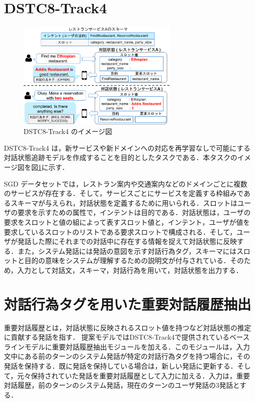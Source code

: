 \documentclass[a4j,twoside]{jarticle}
\begin{document}
\begin{論文概要}
\section{DSTC8-Track4}
\begin{figure}[htb]
  \centering
  \includegraphics[width=7.9cm]{task.eps}
  \caption{DSTC8-Track4 のイメージ図}
  \label{fig:task}
\end{figure}
DSTC8-Track4 は，新サービスや新ドメインへの対応を再学習なしで可能にする対話状態追跡モデルを作成することを目的としたタスクである．本タスクのイメージ図を図\ref{fig:task}に示す．
\par
SGD データセットでは，レストラン案内や交通案内などのドメインごとに複数のサービスが存在する．そして，サービスごとにサービスを定義する枠組みであるスキーマが与えられ，対話状態を定義するために用いられる．スロットはユーザの要求を示すための属性で，インテントは目的である．対話状態は，ユーザの要求をスロットと値の組によって表すスロット値と，インテント，ユーザが値を要求しているスロットのリストである要求スロットで構成される．そして，ユーザが発話した際にそれまでの対話中に存在する情報を捉えて対話状態に反映する．また，システム発話には発話の意図を示す対話行為タグ，スキーマにはスロットと目的の意味をシステムが理解するための説明文が付与されている．そのため，入力として対話文，スキーマ，対話行為を用いて，対話状態を出力する．

\vspace{-2mm}
\section{対話行為タグを用いた重要対話履歴抽出}
重要対話履歴とは，対話状態に反映されるスロット値を持つなど対話状態の推定に貢献する発話を指す．
提案モデルではDSTC8-Track4で提供されているベースラインモデルに重要対話履歴抽出モジュールを加える．このモジュールは，入力文中にある前のターンのシステム発話が特定の対話行為タグを持つ場合に，その発話を保持する．既に発話を保持している場合は，新しい発話に更新する．そして，元々保持されていた発話を重要対話履歴として入力に加える．入力は，重要対話履歴，前のターンのシステム発話，現在のターンのユーザ発話の3発話とする．
\vspace{-2mm}

\end{論文概要}
\end{document}

